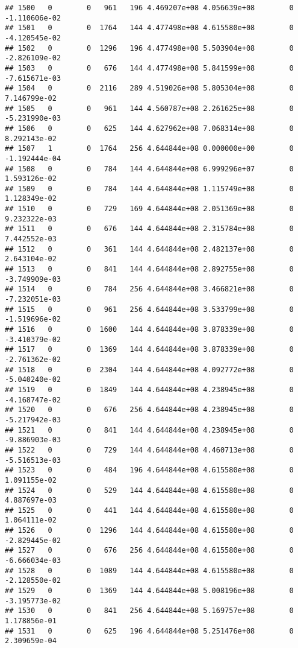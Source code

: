 \documentclass[
]{article}
\begin{document}
\begin{enumerate}
\begin{verbatim}
## 1500   0        0   961   196 4.469207e+08 4.056639e+08        0 -1.110606e-02
## 1501   0        0  1764   144 4.477498e+08 4.615580e+08        0 -4.120545e-02
## 1502   0        0  1296   196 4.477498e+08 5.503904e+08        0 -2.826109e-02
## 1503   0        0   676   144 4.477498e+08 5.841599e+08        0 -7.615671e-03
## 1504   0        0  2116   289 4.519026e+08 5.805304e+08        0  7.146799e-02
## 1505   0        0   961   144 4.560787e+08 2.261625e+08        0 -5.231990e-03
## 1506   0        0   625   144 4.627962e+08 7.068314e+08        0  8.292143e-02
## 1507   1        0  1764   256 4.644844e+08 0.000000e+00        0 -1.192444e-04
## 1508   0        0   784   144 4.644844e+08 6.999296e+07        0  1.593126e-02
## 1509   0        0   784   144 4.644844e+08 1.115749e+08        0  1.128349e-02
## 1510   0        0   729   169 4.644844e+08 2.051369e+08        0  9.232322e-03
## 1511   0        0   676   144 4.644844e+08 2.315784e+08        0  7.442552e-03
## 1512   0        0   361   144 4.644844e+08 2.482137e+08        0  2.643104e-02
## 1513   0        0   841   144 4.644844e+08 2.892755e+08        0 -3.749909e-03
## 1514   0        0   784   256 4.644844e+08 3.466821e+08        0 -7.232051e-03
## 1515   0        0   961   256 4.644844e+08 3.533799e+08        0 -1.519696e-02
## 1516   0        0  1600   144 4.644844e+08 3.878339e+08        0 -3.410379e-02
## 1517   0        0  1369   144 4.644844e+08 3.878339e+08        0 -2.761362e-02
## 1518   0        0  2304   144 4.644844e+08 4.092772e+08        0 -5.040240e-02
## 1519   0        0  1849   144 4.644844e+08 4.238945e+08        0 -4.168747e-02
## 1520   0        0   676   256 4.644844e+08 4.238945e+08        0 -5.217942e-03
## 1521   0        0   841   144 4.644844e+08 4.238945e+08        0 -9.886903e-03
## 1522   0        0   729   144 4.644844e+08 4.460713e+08        0 -5.516513e-03
## 1523   0        0   484   196 4.644844e+08 4.615580e+08        0  1.091155e-02
## 1524   0        0   529   144 4.644844e+08 4.615580e+08        0  4.887697e-03
## 1525   0        0   441   144 4.644844e+08 4.615580e+08        0  1.064111e-02
## 1526   0        0  1296   144 4.644844e+08 4.615580e+08        0 -2.829445e-02
## 1527   0        0   676   256 4.644844e+08 4.615580e+08        0 -6.666034e-03
## 1528   0        0  1089   144 4.644844e+08 4.615580e+08        0 -2.128550e-02
## 1529   0        0  1369   144 4.644844e+08 5.008196e+08        0 -3.195773e-02
## 1530   0        0   841   256 4.644844e+08 5.169757e+08        0  1.178856e-01
## 1531   0        0   625   196 4.644844e+08 5.251476e+08        0  2.309659e-04

\end{verbatim}
\end{enumerate}
\end{document}
